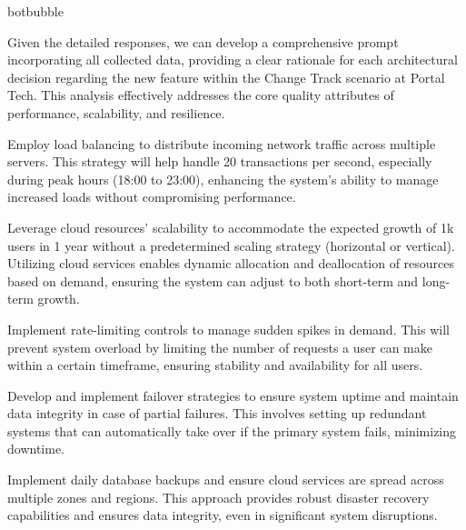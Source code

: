 \begin{chatout}{botbubble}{}

Given the detailed responses, we can develop a comprehensive prompt incorporating all collected data, providing a clear rationale for each architectural decision regarding the new feature within the Change Track scenario at Portal Tech. This analysis effectively addresses the core quality attributes of performance, scalability, and resilience.




 Employ load balancing to distribute incoming network traffic across multiple servers. This strategy will help handle 20 transactions per second, especially during peak hours (18:00 to 23:00), enhancing the system's ability to manage increased loads without compromising performance.


 Leverage cloud resources' scalability to accommodate the expected growth of 1k users in 1 year without a predetermined scaling strategy (horizontal or vertical). Utilizing cloud services enables dynamic allocation and deallocation of resources based on demand, ensuring the system can adjust to both short-term and long-term growth.

 Implement rate-limiting controls to manage sudden spikes in demand. This will prevent system overload by limiting the number of requests a user can make within a certain timeframe, ensuring stability and availability for all users.


 Develop and implement failover strategies to ensure system uptime and maintain data integrity in case of partial failures. This involves setting up redundant systems that can automatically take over if the primary system fails, minimizing downtime.

 Implement daily database backups and ensure cloud services are spread across multiple zones and regions. This approach provides robust disaster recovery capabilities and ensures data integrity, even in significant system disruptions.


\end{chatout}
